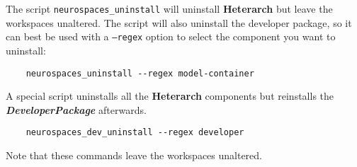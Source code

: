 \documentclass[12pt]{article}
\begin{document}
The script {\tt neurospaces\_uninstall} will uninstall {\bf\small Heterarch} but leave the
workspaces unaltered.  The script will also uninstall the developer
package, so it can best be used with a {\tt --regex} option to select
the component you want to uninstall:

\begin{verbatim}
    neurospaces_uninstall --regex model-container
\end{verbatim}
A special script uninstalls all the {\bf\small Heterarch} components but reinstalls the
{\bf{\emph{DeveloperPackage}}} afterwards.

\begin{verbatim}
    neurospaces_dev_uninstall --regex developer
\end{verbatim}
Note that these commands leave the workspaces unaltered.
\end{document}
